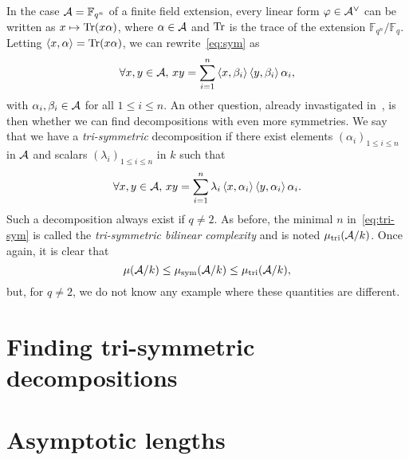 \documentclass[a4paper,11pt]{article}
\begin{document}
In the case $\mathcal{A}=\mathbb{F}_{q^n}$ of a finite field extension, every linear form
$\varphi\in\mathcal{A}^\vee$ can be written as $x\mapsto\operatorname{Tr}(x\alpha)$, where
$\alpha\in\mathcal{A}$ and $\operatorname{Tr}$ is the trace of the extension
$\mathbb{F}_{q^n}/\mathbb{F}_q$. Letting $\left\langle x,\alpha\right\rangle=\operatorname{Tr}(x\alpha)$, we can
rewrite~\eqref{eq:sym} as
\begin{equation}
  \forall x, y\in\mathcal{A},\,xy = \sum_{i=1}^{n}\left\langle x,\beta_i\right\rangle\left\langle y,\beta_i\right\rangle\alpha_i,
  \label{eq:sym-tr}
\end{equation}
with $\alpha_i, \beta_i\in\mathcal{A}$ for all $1\leq i\leq n$. An other question,
already invastigated in~\cite{SL81}, is then
whether we can find decompositions with even more symmetries. We say that we
have a \emph{tri-symmetric} decomposition if there exist elements $(\alpha_i)_{1\leq i
\leq n}$ in $\mathcal{A}$ and scalars $(\lambda_i)_{1\leq i \leq n}$ in $k$ such that
\begin{equation}
  \forall x, y\in\mathcal{A},\,xy =
  \sum_{i=1}^{n}\lambda_i\left\langle x,\alpha_i\right\rangle\left\langle y,\alpha_i\right\rangle\alpha_i.
  \label{eq:tri-sym}
\end{equation}
Such a decomposition always exist if $q\neq2$. As before, the minimal $n$
in~\eqref{eq:tri-sym} is called the \emph{tri-symmetric bilinear complexity} and
is noted $\mu_{\text{tri}}(\mathcal{A}/k)$. Once again, it is clear that
\[
  \mu(\mathcal{A}/k) \leq \mu_{\text{sym}}(\mathcal{A}/k)\leq\mu_{\text{tri}}(\mathcal{A}/k),
\]
but, for $q\neq2$, we do not know any example where these quantities are
different.

\section{Finding tri-symmetric decompositions}
\label{sec:algos}

\section{Asymptotic lengths}
\label{sec:asymptotic}
\end{document}
